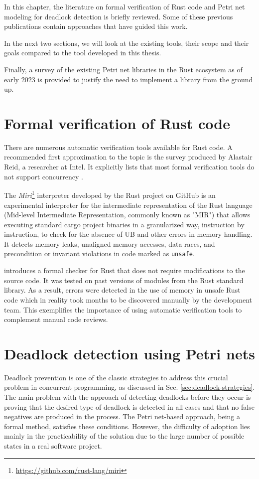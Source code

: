 \documentclass[../Thesis.tex]{subfiles}
\begin{document}
In this chapter, the literature on formal verification of Rust code
and Petri net modeling for deadlock detection is briefly reviewed.
Some of these previous publications contain approaches
that have guided this work.

In the next two sections, we will look at the existing tools,
their scope and their goals compared to the tool developed in this thesis.

Finally, a survey of the existing Petri net libraries in the Rust ecosystem
as of early 2023 is provided to justify the need to implement a library
from the ground up.

\section{Formal verification of Rust code}

There are numerous automatic verification tools available for Rust code.
A recommended first approximation to the topic is
the survey produced by Alastair Reid, a researcher at Intel.
It explicitly lists that most formal verification tools
do not support concurrency \cite{reid2021}.

The \emph{Miri}\footnote{\url{https://github.com/rust-lang/miri}} interpreter
developed by the Rust project on GitHub is an experimental interpreter
for the intermediate representation of the Rust language
(Mid-level Intermediate Representation, commonly known as "MIR")
that allows executing standard cargo project binaries
in a granularized way, instruction by instruction,
to check for the absence of \acrfull{UB}
and other errors in memory handling.
It detects memory leaks, unaligned memory accesses, data races,
and precondition or invariant violations in code marked as \texttt{unsafe}.

\cite{toman2015crust} introduces a formal checker for Rust
that does not require modifications to the source code.
It was tested on past versions of modules from the Rust standard library.
As a result, errors were detected in the use of memory in unsafe Rust code
which in reality took months to be discovered manually by the development team.
This exemplifies the importance of using automatic verification tools
to complement manual code reviews.

\section{Deadlock detection using Petri nets}

Deadlock prevention is one of the classic strategies
to address this crucial problem in concurrent programming,
as discussed in Sec. \ref{sec:deadlock-strategies}.
The main problem with the approach of detecting deadlocks before they occur
is proving that the desired type of deadlock is detected in all cases
and that no false negatives are produced in the process.
The Petri net-based approach, being a formal method, satisfies these conditions.
However, the difficulty of adoption lies mainly in the practicability of the solution
due to the large number of possible states in a real software project.
\end{document}
